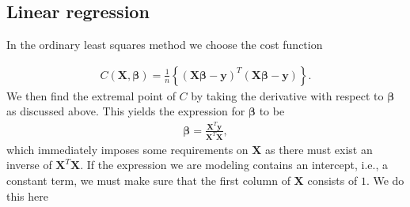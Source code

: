 \documentclass[letterpaper,10pt,english]{sphinxmanual}
\begin{document}
\begin{sphinxVerbatim}[commandchars=\\\{\}]
     
   
    \PYG{p}{[}\PYG{p}{]}  \PYG{p}{[}\PYG{p}{]} \PYG{p}{[}\PYG{p}{]}
  
       
\end{sphinxVerbatim}


\subsection{Linear regression}
\label{\detokenize{chapter4:linear-regression}}
In the ordinary least squares method we choose the cost function




\begin{equation*}
\begin{split}
\begin{equation}
    C(\boldsymbol{X}, \boldsymbol{\beta})= \frac{1}{n}\left\{(\boldsymbol{X}\boldsymbol{\beta} - \boldsymbol{y})^T(\boldsymbol{X}\boldsymbol{\beta} - \boldsymbol{y})\right\}.
\label{_auto6} \tag{6}
\end{equation}
\end{split}
\end{equation*}
We then find the extremal point of \(C\) by taking the derivative with respect to \(\boldsymbol{\beta}\) as discussed above.
This yields the expression for \(\boldsymbol{\beta}\) to be
\begin{equation*}
\begin{split}
\boldsymbol{\beta} = \frac{\boldsymbol{X}^T \boldsymbol{y}}{\boldsymbol{X}^T \boldsymbol{X}},
\end{split}
\end{equation*}
which immediately imposes some requirements on \(\boldsymbol{X}\) as there must exist
an inverse of \(\boldsymbol{X}^T \boldsymbol{X}\). If the expression we are modeling contains an
intercept, i.e., a constant term, we must make sure that the
first column of \(\boldsymbol{X}\) consists of \(1\). We do this here
\end{document}
